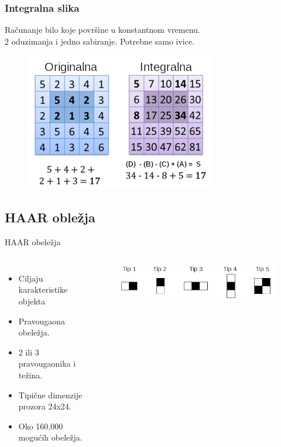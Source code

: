 \documentclass{beamer}
\begin{document}
\begin{frame}
  \frametitle{Integralna slika}
  Računanje bilo koje površine u konstantnom vremenu. \\
  2 oduzimanja i jedno sabiranje.
  Potrebne samo ivice.
  \begin{figure}[H]
    \centering
    \includegraphics[width=0.55\linewidth]{../images/integral_image2}
  \end{figure}
\end{frame}

\subsection{HAAR obležja}
\begin{frame}{HAAR obeležja}
    \begin{columns}[onlytextwidth,T]
      \column{\dimexpr\linewidth-50mm-0mm}

      \begin{itemize}
      \item<1-> Ciljaju karakteristike objekta
      \item<1-> Pravougaona obeležja.
      \item<1-> 2 ili 3 pravougaonika i težina.
      \item<1-> Tipične dimenzije prozora 24x24.
      \item<1-> Oko 160,000 mogućih obeležja.
      \end{itemize}

      \column{60mm}

      \begin{figure}[H]
        \centering
        \includegraphics[width=0.8\linewidth]{../images/haar_features1}
      \end{figure}
    \end{columns}
\end{frame}
\end{document}
